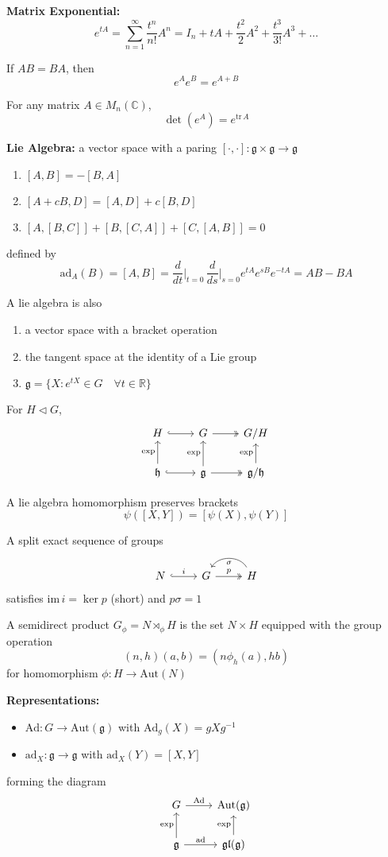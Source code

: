 \documentclass[12pt]{article}
\newcommand{\R}{\mathbb{R}}
\newcommand{\C}{\mathbb{C}}
\newcommand{\tr}{\text{tr}\,}
\newcommand{\g}{\mathfrak{g}}
\newcommand{\h}{\mathfrak{h}}
\newcommand{\gl}{\mathfrak{gl}}
\newcommand{\im}{\text{im}\,}
\newcommand{\Ad}{\text{Ad}}
\newcommand{\ad}{\text{ad}}
\newcommand{\Aut}{\text{Aut}}
\begin{document}
\textbf{Matrix Exponential:}
\[e^{tA} = \sum_{n=1}^{\infty} \frac{t^n}{n!}A^n = I_n + tA + \frac{t^2}{2}A^2 + \frac{t^3}{3!}A^3 + \dots\]

If $AB = BA$, then
\[e^A e^B = e^{A + B}\]

For any matrix $A \in M_n(\C)$, 
\[\det(e^A) = e^{\tr A}\] 

\textbf{Lie Algebra:} a vector space with a paring $[\cdot, \cdot]: \g \times \g \to \g$
\begin{enumerate}
    \item $[A, B] = -[B, A]$ 
    \item $[A + cB, D] = [A, D] + c[B, D]$
    \item $[A, [B, C]] + [B, [C, A]] + [C, [A, B]] = 0$  
\end{enumerate}
defined by 
\[\ad_A(B) = [A, B] = \frac{d}{dt}\bigg\vert_{t=0}\, \frac{d}{ds}\bigg\vert_{s=0} e^{tA}e^{sB}e^{-tA} = AB - BA \]

A lie algebra is also 
\begin{enumerate}
    \item a vector space with a bracket operation
    \item the tangent space at the identity of a Lie group 
    \item $\g = \{X: e^{tX} \in G \quad \forall t \in \R\}$
\end{enumerate}

For $H \triangleleft G$, 
\[\begin{tikzcd}
    H \arrow[hook]{r} & G \arrow[two heads]{r} & G/H\\ 
    \h \arrow[hook]{r} \arrow{u}{\exp} & \g \arrow{u}{\exp} \arrow[two heads]{r} & \g/\h \arrow{u}{\exp}
\end{tikzcd}\]

A lie algebra homomorphism preserves brackets 
\[\psi([X, Y]) = [\psi(X), \psi(Y)]\]

A split exact sequence of groups 
\[\begin{tikzcd}
    N \arrow[hook]{r}{i} & G \arrow[two heads]{r}{p} & H \arrow[bend right=60]{l}{\sigma}
\end{tikzcd}\]
satisfies $\im i = \ker p$ (short) and $p\sigma = 1$ 

A semidirect product $G_{\phi} = N \rtimes_{\phi} H$ is the set $N \times H$ equipped with the group operation
\[(n, h)(a, b) = (n\phi_h(a), hb)\]
for homomorphism $\phi: H \to \Aut(N)$

\textbf{Representations:} 
\begin{itemize}
    \item $\Ad: G \to \Aut(\g)$ with $\Ad_g(X) = gXg^{-1}$
    \item $\ad_X: \g \to \g$ with $\ad_X(Y) = [X, Y]$
\end{itemize}
forming the diagram 
\[\begin{tikzcd}
    G \arrow{r}{\Ad} & \Aut(\g)\\ 
    \g \arrow{u}{\exp} \arrow{r}{\ad} & \gl(\g) \arrow{u}{\exp}
\end{tikzcd}\]
\end{document}

